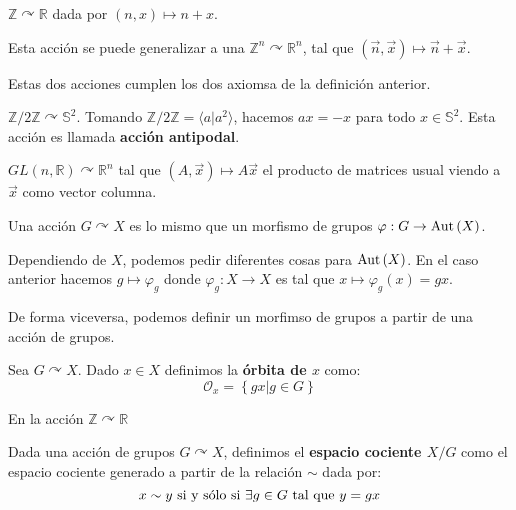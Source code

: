 \documentclass[12pt]{report}
\newcounter{it}
\theoremstyle{largebreak}
\newcommand\cf[3]{\ensuremath{#1:#2\rightarrow#3}}
\newcommand{\Aut}[1]{\ensuremath{\textup{Aut}\left(#1\right)}}
\newcommand{\gen}[1]{\ensuremath{\langle#1\rangle}}
\begin{document}
    \begin{exa}
        $\mathbb{Z}\curvearrowright\mathbb{R}$ dada por $(n,x)\mapsto n+x$.

        Esta acción se puede generalizar a una $\mathbb{Z}^n\curvearrowright\mathbb{R}^n$, tal que $(\vec{n},\vec{x})\mapsto\vec{n}+\vec{x}$.

        Estas dos acciones cumplen los dos axiomsa de la definición anterior.
    \end{exa}

    \begin{exa}
        $\mathbb{Z}/2\mathbb{Z}\curvearrowright\mathbb{S}^2$. Tomando $\mathbb{Z}/2\mathbb{Z}=\gen{a|a^2}$, hacemos $ax=-x$ para todo $x\in\mathbb{S}^2$. Esta acción es llamada \textbf{acción antipodal}.
    \end{exa}

    \begin{exa}
        $GL(n,\mathbb{R})\curvearrowright\mathbb{R}^n$ tal que $(A,\vec{x})\mapsto A\vec{x}$ el producto de matrices usual viendo a $\vec{x}$ como vector columna.
    \end{exa}

    \begin{obs}
        Una acción $G\curvearrowright X$ es lo mismo que un morfismo de grupos $\cf{\varphi}{G}{\Aut{X}}$.
        
        Dependiendo de $X$, podemos pedir diferentes cosas para $\Aut{X}$. En el caso anterior hacemos $g\mapsto\varphi_g$ donde $\cf{\varphi_g}{X}{X}$ es tal que $x\mapsto\varphi_g(x)=gx$.

        De forma viceversa, podemos definir un morfimso de grupos a partir de una acción de grupos.
    \end{obs}

    \begin{mydef}
        Sea $G\curvearrowright X$. Dado $x\in X$ definimos la \textbf{órbita de $x$} como:
        \begin{equation*}
            \mathcal{O}_x=\left\{gx\Big|g\in G \right\}
        \end{equation*}
    \end{mydef}

    \begin{exa}
        En la acción $\mathbb{Z}\curvearrowright\mathbb{R}$
    \end{exa}

    \begin{mydef}
        Dada una acción de grupos $G\curvearrowright X$, definimos el \textbf{espacio cociente $X/G$} como el espacio cociente generado a partir de la relación $\sim$ dada por:
        \begin{equation*}
            x\sim y\textup{ si y sólo si }\exists g\in G\textup{ tal que }y=gx
        \end{equation*}
    \end{mydef}
    
\end{document}
